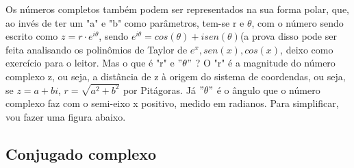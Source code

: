 \documentclass{article}
\begin{document}
Os números completos também podem ser representados na sua forma polar, que, ao invés de  ter um "a" e "b" como parâmetros, tem-se r e $\theta$, com o número sendo escrito como $z = r \cdot e^{i \theta}$, sendo $e^{i \theta} = cos(\theta) + i sen(\theta)$(a prova disso pode ser feita analisando os polinômios de Taylor de $e^x, sen(x), cos(x)$, deixo como exercício para o leitor. Mas o que é "r" e $"\theta"$ ? O "r" é a magnitude do número complexo z, ou seja, a distância de z à origem do sistema de coordendas, ou seja, se $z = a + bi$, $r = \sqrt{a^2 + b^2}$ por Pitágoras. Já $"\theta"$ é o ângulo que o número complexo faz com o semi-eixo x positivo, medido em radianos. Para simplificar, vou fazer uma  figura abaixo.
\begin{center}
\end{center}

\subsection{Conjugado complexo}
\end{document}
